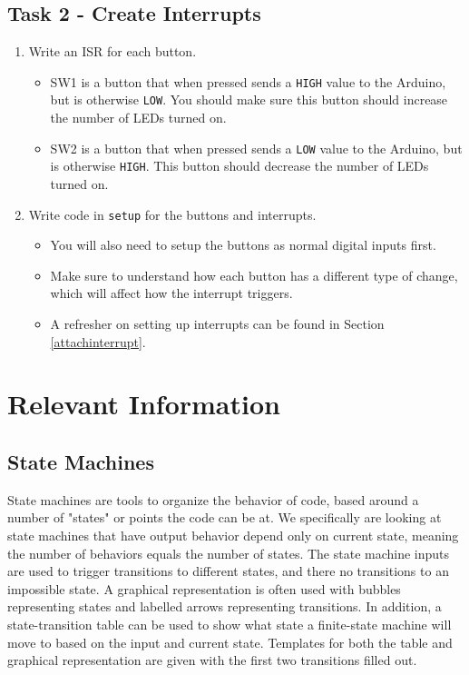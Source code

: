 \documentclass{article}
\begin{document}
    \subsection{Task 2 - Create Interrupts}
        \begin{enumerate}
            \item Write an ISR for each button.
            \begin{itemize}
                \item SW1 is a button that when pressed sends a \texttt{HIGH} value to the Arduino, but is otherwise \texttt{LOW}. You should make sure this button should increase the number of LEDs turned on. 
                \item SW2 is a button that when pressed sends a \texttt{LOW} value to the Arduino, but is otherwise \texttt{HIGH}. This button should decrease the number of LEDs turned on.
            \end{itemize}
            \item Write code in \texttt{setup} for the buttons and interrupts.
            \begin{itemize}
                \item You will also need to setup the buttons as normal digital inputs first. 
                \item Make sure to understand how each button has a different type of change, which will affect how the interrupt triggers.
                \item A refresher on setting up interrupts can be found in Section \ref{attachinterrupt}.
            \end{itemize}
        \end{enumerate}
        
\section{Relevant Information}
    \subsection{State Machines} \label{statemachine}
        State machines are tools to organize the behavior of code, based around a number of "states" or points the code can be at. We specifically are looking at state machines that have output behavior depend only on current state, meaning the number of behaviors equals the number of states. The state machine inputs are used to trigger transitions to different states, and there no transitions to an impossible state. A graphical representation is often used with bubbles representing states and labelled arrows representing transitions. In addition, a state-transition table can be used to show what state a finite-state machine will move to based on the input and current state. Templates for both the table and graphical representation are given with the first two transitions filled out.
        
\end{document}
